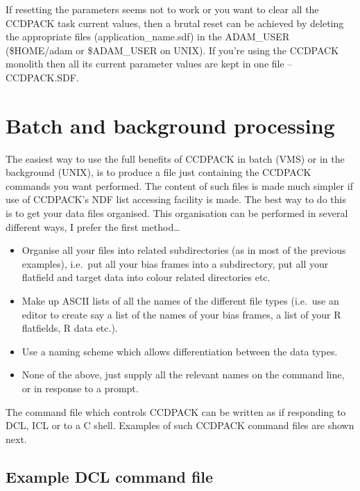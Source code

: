 If resetting the parameters seems not to work or you want to clear all
the CCDPACK task current values, then a brutal reset can be achieved by
deleting the appropriate files (application\_name.sdf) in the ADAM\_USER
(\$HOME/adam or \$ADAM\_USER on UNIX). If you're using the CCDPACK
monolith then all its current parameter values are kept in one file --
CCDPACK.SDF.

\section{Batch and background processing}
\label{sec:batch}

The easiest way to use the full benefits of CCDPACK in batch (VMS) or in
the background (UNIX), is to produce a file just containing the CCDPACK
commands you want performed. The content of such files is made much
simpler if use of CCDPACK's NDF list accessing facility is made. The
best way to do this is to get your data files organised. This
organisation can be performed in several different ways, I prefer the
first method\ldots

\begin{itemize}
\item Organise all your files into related subdirectories (as in most of
the previous examples), i.e.\ put all your bias frames into a
subdirectory, put all your flatfield and target data into colour related
directories etc.

\item Make up ASCII lists of all the names of the different file types
(i.e.\ use an editor to create say a list of the names of your bias
frames, a list of your R flatfields, R data etc.).

\item Use a naming scheme which allows differentiation between the data
types.

\item None of the above, just supply all the relevant names on the
command line, or in response to a prompt.
\end{itemize}

The command file which controls CCDPACK can be written as if responding
to DCL, ICL or to a C shell. Examples of such CCDPACK command files are
shown next.

\subsection{Example DCL command file}

